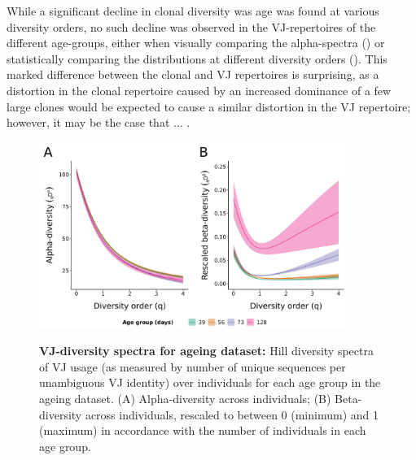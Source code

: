 While a significant decline in clonal diversity was age was found at various diversity orders, no such decline was observed in the VJ-repertoires of the different age-groups, either when visually comparing the alpha-spectra () or statistically comparing the distributions at different diversity orders (). This marked difference between the clonal and VJ repertoires is surprising, as a distortion in the clonal repertoire caused by an increased dominance of a few large clones would be expected to cause a similar distortion in the VJ repertoire; however, it may be the case that ... . %

\begin{figure}
\centering
\includegraphics[width = 0.9\textwidth]{_Figures/png/ageing-VJ-diversity-alpha-beta}
\begin{subfigure}{0em}
\label{fig:igseq-ageing-VJ-diversity-alpha}
\end{subfigure}
\begin{subfigure}{0em}
\label{fig:igseq-ageing-VJ-diversity-beta}
\end{subfigure}
\caption{\textbf{VJ-diversity spectra for ageing dataset:} Hill diversity spectra of VJ usage (as measured by number of unique sequences per unambiguous VJ identity) over individuals for each age group in the \igseq ageing dataset. (A) Alpha-diversity across individuals; (B) Beta-diversity across individuals, rescaled to between 0 (minimum) and 1 (maximum) in accordance with the number of individuals in each age group.}
\label{fig:igseq-ageing-VJ-diversity-spectra}
\end{figure}

